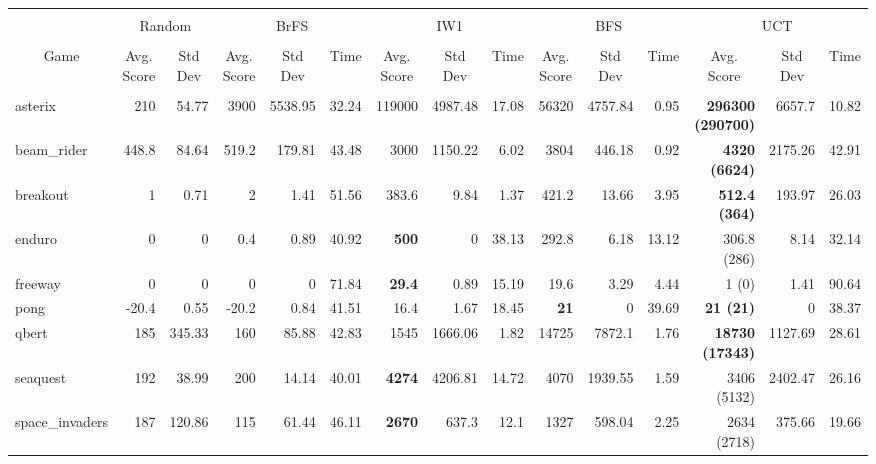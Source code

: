 \begin{table*}
\addtolength{\tabcolsep}{-2pt}
{\scriptsize
\begin{tabular}{@{}l|rr|rrr|rrr|rrr|rrr@{}}
\hline\\[-3ex]
\multicolumn{1}{c|}{} & \multicolumn{2}{c|}{Random} & \multicolumn{3}{c|}{BrFS}& \multicolumn{3}{c|}{IW1}& \multicolumn{3}{c|}{BFS}& \multicolumn{3}{c}{UCT} \\[.2ex]
\hline\\[-3ex]
\multicolumn{1}{c}{Game}  & \multicolumn{1}{c}{Avg. Score} & \multicolumn{1}{c|}{Std Dev}  & \multicolumn{1}{c}{Avg. Score} & \multicolumn{1}{c}{Std Dev} &  \multicolumn{1}{c|}{Time}  & \multicolumn{1}{c}{Avg. Score} & \multicolumn{1}{c}{Std Dev} & \multicolumn{1}{c|}{Time}  & \multicolumn{1}{c}{Avg. Score} & \multicolumn{1}{c}{Std Dev} & \multicolumn{1}{c|}{Time}  & \multicolumn{1}{c}{Avg. Score} & \multicolumn{1}{c}{Std Dev} & \multicolumn{1}{c}{Time}\\[.2ex]
\hline\\[-3ex]
asterix         & 210    & 54.77     & 3900  & 5538.95   & 32.24 & 119000        & 4987.48   & 17.08 & 56320       & 4757.84   & 0.95  & \textbf{296300 (290700)} & 6657.7    & 10.82 \\
beam\_rider     & 448.8  & 84.64     & 519.2 & 179.81    & 43.48 & 3000          & 1150.22   & 6.02  & 3804        & 446.18    & 0.92  & \textbf{4320 (6624)}     & 2175.26   & 42.91 \\
breakout        & 1      & 0.71      & 2     & 1.41      & 51.56 & 383.6         & 9.84      & 1.37  & 421.2       & 13.66     & 3.95  & \textbf{512.4 (364)}     & 193.97    & 26.03 \\
enduro          & 0      & 0         & 0.4   & 0.89      & 40.92 & \textbf{500}  & 0         & 38.13 & 292.8       & 6.18      & 13.12 & 306.8 (286)              & 8.14      & 32.14 \\
freeway         & 0      & 0         & 0     & 0         & 71.84 & \textbf{29.4} & 0.89      & 15.19 & 19.6        & 3.29      & 4.44  & 1 (0)                    & 1.41      & 90.64 \\
pong            & -20.4  & 0.55      & -20.2 & 0.84      & 41.51 & 16.4          & 1.67      & 18.45 & \textbf{21} & 0         & 39.69 & \textbf{21 (21)}         & 0         & 38.37 \\
qbert           & 185    & 345.33    & 160   & 85.88     & 42.83 & 1545          & 1666.06   & 1.82  & 14725       & 7872.1    & 1.76  & \textbf{18730 (17343)}   & 1127.69   & 28.61 \\
seaquest        & 192    & 38.99     & 200   & 14.14     & 40.01 & \textbf{4274} & 4206.81   & 14.72 & 4070        & 1939.55   & 1.59  & 3406 (5132)              & 2402.47   & 26.16 \\
space\_invaders & 187    & 120.86    & 115   & 61.44     & 46.11 & \textbf{2670} & 637.3     & 12.1  & 1327        & 598.04    & 2.25  & 2634 (2718)              & 375.66    & 19.66
\end{tabular}
}


\end{table*}
